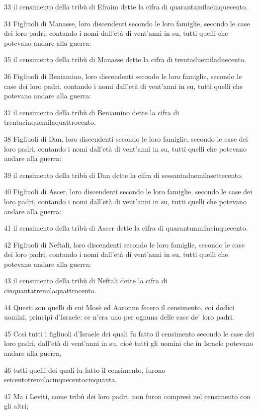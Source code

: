 \par 33 il censimento della tribù di Efraim dette la cifra di quarantamilacinquecento.
\par 34 Figliuoli di Manasse, loro discendenti secondo le loro famiglie, secondo le case dei loro padri, contando i nomi dall'età di vent'anni in su, tutti quelli che potevano andare alla guerra:
\par 35 il censimento della tribù di Manasse dette la cifra di trentaduemiladuecento.
\par 36 Figliuoli di Beniamino, loro discendenti secondo le loro famiglie, secondo le case dei loro padri, contando i nomi dall'età di vent'anni in su, tutti quelli che potevano andare alla guerra:
\par 37 il censimento della tribù di Beniamino dette la cifra di trentacinquemilaquattrocento.
\par 38 Figliuoli di Dan, loro discendenti secondo le loro famiglie, secondo le case dei loro padri, contando i nomi dall'età di vent'anni in su, tutti quelli che potevano andare alla guerra:
\par 39 il censimento della tribù di Dan dette la cifra di sessantaduemilasettecento.
\par 40 Figliuoli di Ascer, loro discendenti secondo le loro famiglie, secondo le case dei loro padri, contando i nomi dall'età di vent'anni in su, tutti quelli che potevano andare alla guerra:
\par 41 il censimento della tribù di Ascer dette la cifra di quarantunmilacinquecento.
\par 42 Figliuoli di Neftali, loro discendenti secondo le loro famiglie, secondo le case dei loro padri, contando i nomi dall'età di vent'anni in su, tutti quelli che potevano andare alla guerra:
\par 43 il censimento della tribù di Neftali dette la cifra di cinquantatremilaquattrocento.
\par 44 Questi son quelli di cui Mosè ed Aaronne fecero il censimento, coi dodici uomini, principi d'Israele: ce n'era uno per ognuna delle case de' loro padri.
\par 45 Così tutti i figliuoli d'Israele dei quali fu fatto il censimento secondo le case dei loro padri, dall'età di vent'anni in su, cioè tutti gli uomini che in Israele potevano andare alla guerra,
\par 46 tutti quelli dei quali fu fatto il censimento, furono seicentotremilacinquecentocinquanta.
\par 47 Ma i Leviti, come tribù dei loro padri, non furon compresi nel censimento con gli altri;
